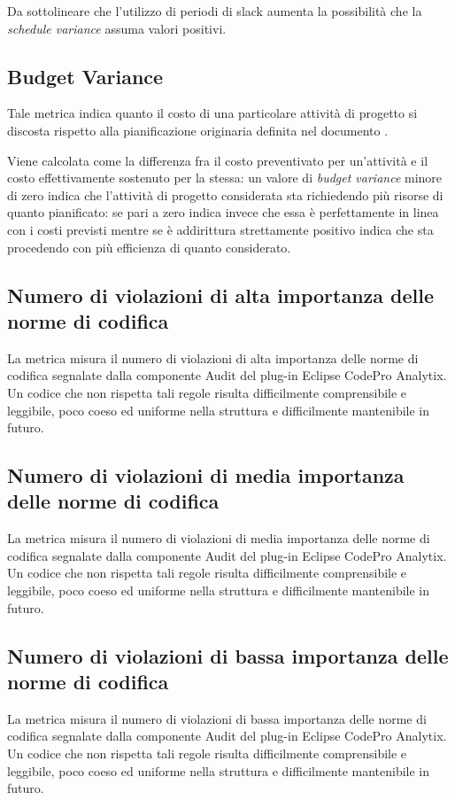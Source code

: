 Da sottolineare che l'utilizzo di periodi di slack aumenta la possibilità che la \emph{schedule variance} assuma valori positivi.



\subsection{Budget Variance}
Tale metrica indica quanto il costo di una particolare attività di progetto si discosta rispetto alla pianificazione originaria definita nel documento \PdP. 

Viene calcolata come la differenza fra il costo preventivato per un'attività e il costo effettivamente sostenuto per la stessa: un valore di \emph{budget variance} minore di zero indica che l'attività di progetto considerata sta richiedendo più risorse di quanto pianificato: se pari a zero indica invece che essa è perfettamente in linea con i costi previsti mentre se è addirittura strettamente positivo indica che sta procedendo con più efficienza di quanto considerato.



\subsection{Numero di violazioni di alta importanza delle norme di codifica}
La metrica misura il numero di violazioni di alta importanza delle norme di codifica segnalate dalla componente Audit del plug-in Eclipse CodePro Analytix. Un codice che non rispetta tali regole risulta difficilmente comprensibile e leggibile, poco coeso ed uniforme nella struttura e difficilmente mantenibile in futuro.



\subsection{Numero di violazioni di media importanza delle norme di codifica}
La metrica misura il numero di violazioni di media importanza delle norme di codifica segnalate dalla componente Audit del plug-in Eclipse CodePro Analytix. Un codice che non rispetta tali regole risulta difficilmente comprensibile e leggibile, poco coeso ed uniforme nella struttura e difficilmente mantenibile in futuro.



\subsection{Numero di violazioni di bassa importanza delle norme di codifica}
La metrica misura il numero di violazioni di bassa importanza delle norme di codifica segnalate dalla componente Audit del plug-in Eclipse CodePro Analytix. Un codice che non rispetta tali regole risulta difficilmente comprensibile e leggibile, poco coeso ed uniforme nella struttura e difficilmente mantenibile in futuro.



